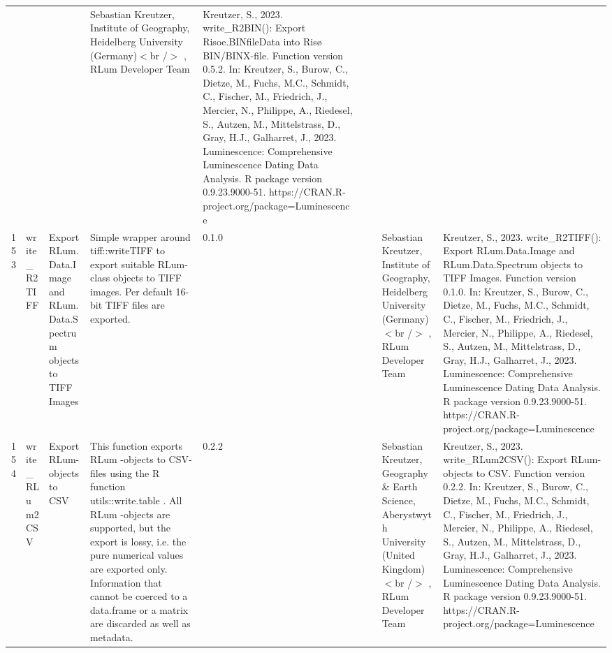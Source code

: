 \begin{table}[ht]
\begin{tabular}{rllllllll}
 &  &  & Sebastian Kreutzer, Institute of Geography, Heidelberg University (Germany)$<$br /$>$ , RLum Developer Team & Kreutzer, S., 2023. write\_R2BIN(): Export Risoe.BINfileData into Risø BIN/BINX-file. Function version 0.5.2. In: Kreutzer, S., Burow, C., Dietze, M., Fuchs, M.C., Schmidt, C., Fischer, M., Friedrich, J., Mercier, N., Philippe, A., Riedesel, S., Autzen, M., Mittelstrass, D., Gray, H.J., Galharret, J., 2023. Luminescence: Comprehensive Luminescence Dating Data Analysis. R package version 0.9.23.9000-51. https://CRAN.R-project.org/package=Luminescence
 \\ 
  153 & write\_R2TIFF & Export RLum.Data.Image and RLum.Data.Spectrum objects to TIFF Images & Simple wrapper around  tiff::writeTIFF  to export suitable RLum-class objects to TIFF images. Per default 16-bit TIFF files are exported. & 0.1.0
 &  &  & Sebastian Kreutzer, Institute of Geography, Heidelberg University (Germany)$<$br /$>$ , RLum Developer Team & Kreutzer, S., 2023. write\_R2TIFF(): Export RLum.Data.Image and RLum.Data.Spectrum objects to TIFF Images. Function version 0.1.0. In: Kreutzer, S., Burow, C., Dietze, M., Fuchs, M.C., Schmidt, C., Fischer, M., Friedrich, J., Mercier, N., Philippe, A., Riedesel, S., Autzen, M., Mittelstrass, D., Gray, H.J., Galharret, J., 2023. Luminescence: Comprehensive Luminescence Dating Data Analysis. R package version 0.9.23.9000-51. https://CRAN.R-project.org/package=Luminescence
 \\ 
  154 & write\_RLum2CSV & Export RLum-objects to CSV & This function exports  RLum -objects to CSV-files using the R function utils::write.table . All  RLum -objects are supported, but the export is lossy, i.e. the pure numerical values are exported only. Information that cannot be coerced to a  data.frame  or a  matrix  are discarded as well as metadata. & 0.2.2
 &  &  & Sebastian Kreutzer, Geography \& Earth Science, Aberystwyth University (United Kingdom)$<$br /$>$ , RLum Developer Team & Kreutzer, S., 2023. write\_RLum2CSV(): Export RLum-objects to CSV. Function version 0.2.2. In: Kreutzer, S., Burow, C., Dietze, M., Fuchs, M.C., Schmidt, C., Fischer, M., Friedrich, J., Mercier, N., Philippe, A., Riedesel, S., Autzen, M., Mittelstrass, D., Gray, H.J., Galharret, J., 2023. Luminescence: Comprehensive Luminescence Dating Data Analysis. R package version 0.9.23.9000-51. https://CRAN.R-project.org/package=Luminescence
 \\ 
   \hline
\end{tabular}
\end{table}

